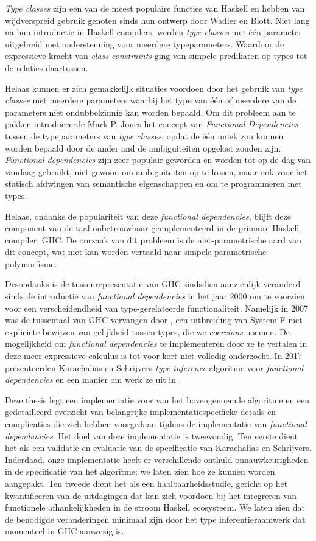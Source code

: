 \textit{Type classes} zijn een van de meest populaire functies van Haskell en
hebben van wijdverspreid gebruik genoten sinds hun ontwerp door Wadler en Blott.
Niet lang na hun introductie in Haskell-compilers, werden \textit{type classes}
met één parameter uitgebreid met ondersteuning voor meerdere typeparameters.
Waardoor de expressieve kracht van \textit{class constraints} ging van simpele
predikaten op types tot de relaties daartussen.

Helaas kunnen er zich gemakkelijk situaties voordoen door het gebruik van
\textit{type classes} met meerdere parameters waarbij het type van één of
meerdere van de parameters niet ondubbelzinnig kan worden bepaald. Om dit
probleem aan te pakken introduceerde Mark P. Jones het concept van
\textit{Functional Dependencies} tussen de typeparameters van \textit{type
classes}, opdat de één uniek zou kunnen worden bepaald door de ander and de
ambiguiteiten opgelost zouden zijn.  \textit{Functional dependencies} zijn zeer
populair geworden en worden tot op de dag van vandaag gebruikt, niet gewoon om
ambiguiteiten op te lossen, maar ook voor het statisch afdwingen van semantische
eigenschappen en om te programmeren met types.

Helaas, ondanks de populariteit van deze \textit{functional dependencies},
blijft deze component van de taal onbetrouwbaar geïmplementeerd in de primaire
Haskell-compiler, GHC. De oorzaak van dit probleem is de niet-parametrische aard
van dit concept, wat niet kan worden vertaald naar simpele parametrische
polymorfisme.

Desondanks is de tussenrepresentatie van GHC sindsdien aanzienlijk veranderd
sinds de introductie van \textit{functional dependencies} in het jaar 2000 om te
voorzien voor een verscheidendheid van type-gerelateerde functionaliteit.
Namelijk in 2007 was de tussentaal van GHC vervangen door \systemfc, een
uitbreiding van System F met expliciete bewijzen van gelijkheid tussen types,
die we \textit{coercions} noemen. De mogelijkheid om \textit{functional
dependencies} te implementeren door ze te vertalen in deze meer expressieve
calculus is tot voor kort niet volledig onderzocht. In 2017 presenteerden
Karachalias en Schrijvers \textit{type inference} algoritme voor
\textit{functional dependencies} en een manier om werk ze uit in \systemfc.

Deze thesis legt een implementatie voor van het bovengenoemde algoritme en een
gedetailleerd overzicht van belangrijke implementatiespecifieke details en
complicaties die zich hebben voorgedaan tijdens de implementatie van
\textit{functional dependencies}.
%
Het doel van deze implementatie is tweevoudig.
%
Ten eerste dient het als een validatie en evaluatie van de specificatie van
Karachalias en Schrijvers. Inderdaad, onze implementatie heeft er verschillende
onthuld onnauwkeurigheden in de specificatie van het algoritme; we laten zien
hoe ze kunnen worden aangepakt.
%
Ten tweede dient het als een haalbaarheidsstudie, gericht op het kwantificeren
van de uitdagingen dat kan zich voordoen bij het integreren van functionele
afhankelijkheden in de stroom Haskell ecosysteem. We laten zien dat de benodigde
veranderingen minimaal zijn door het type inferentieraamwerk dat momenteel in
GHC aanwezig is.
